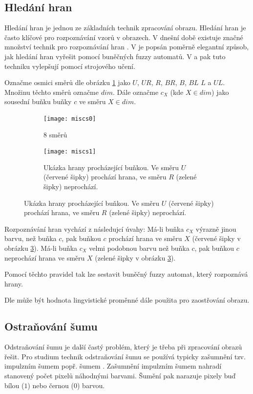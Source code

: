 \documentclass[a4paper,10pt]{article}
\begin{document}
\subsection{Hledání hran}
Hledání hran je jednou ze základních technik zpracování obrazu. Hledání hran je často klíčové pro rozpoznávání vzorů v obrazech. V dnešní době existuje značné množství technik pro rozpoznávání hran \cite{MaiAgg-StuComVarImDetEdTec}. V \cite{MarMeySol-HybMetGasDifModFuzCelAutImSha} je popsán poměrně elegantní způsob, jak hledání hran vyřešit pomocí buněčných fuzzy automatů. V \cite{PatMor-EdgDetTecFuzzLogCEllLeaAutFuzzImPro} a \cite{PatMor-EdgDetTecFuzzLogCEllLeaAutFuzzImPro} pak tuto techniku vylepšují pomocí strojového učení.

Označme osmici směrů dle obrázku \ref{img:Directions:8Directions} jako $U$, $UR$, $R$, $BR$, $B$, $BL$ $L$ a $UL$. Množinu těchto směrů označme $dim$. Dále označme $c_X$ (kde $X \in dim$) jako sousední buňku buňky $c$ ve směru $X \in dim$.

\begin{figure}
   \begin{subfigure}[t]{0.4\textwidth}
      \texttt{[image: miscs0]}
      \caption{8 směrů}  \label{img:Directions:8Directions}
    \end{subfigure}%
%
    \begin{subfigure}[t]{0.4\textwidth}
      \texttt{[image: miscs1]}
      \caption{Ukázka hrany procházející buňkou. Ve směru $U$ (červené šipky) prochází hrana, ve směru $R$ (zelené šipky) neprochází.}  \label{img:Directions:Edges}
    \end{subfigure}
\end{figure}

Rozpoznávání hran vychází z následujcí úvahy: Má-li buňka $c_X$ výrazně jinou barvu, než buňka $c$, pak buňkou $c$ prochází hrana ve směru $X$ (červené šipky v obrázku \ref{img:Directions:Edges}). Má-li buňka $c_X$ velmi podobnou barvu než buňka $c$, pak buňkou $c$ neprochází hrana ve směru $X$ (zelené šipky v obrázku \ref{img:Directions:Edges}). 

Pomocí těchto pravidel tak lze sestavit buněčný fuzzy automat, který rozpoznává hrany. 

Dle \cite{MarMeySol-HybMetGasDifModFuzCelAutImSha} může být hodnota lingvistické proměnné  dále použita pro zaostřování obrazu.

\subsection{Ostraňování šumu} \label{subs:NoisRem}
Odstraňování šumu je další častý problém, který je třeba při zpracování obrazů řešit. Pro studium technik odstraňování šumu se používá typicky zašumnění tzv. impulzním šumem popř. šumem . Zašumnění impulzním šumem nahradí stanovený počet pixelů náhodnými barvami. Šumění  pak narazuje pixely buď bílou ($1$) nebo černou ($0$) barvou.
\end{document}
